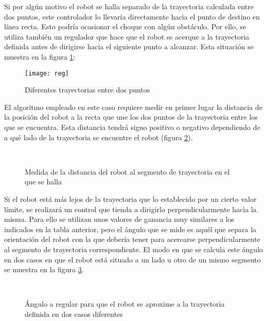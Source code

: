Si por algún motivo el robot se halla separado de la trayectoria calculada entre dos puntos, este controlador lo llevaría directamente hacia el punto de destino en línea recta. Esto podría ocasionar el choque con algún obstáculo. Por ello, se utiliza también un regulador que hace que el robot se acerque a la trayectoria definida antes de dirigirse hacia el siguiente punto a alcanzar. Esta situación se muestra en la figura \ref{fg:reg}:

\begin{figure}[h]
  \centering\texttt{[image: reg]}\\
  \caption{Diferentes trayectorias entre dos puntos}\label{fg:reg}
\end{figure}

El algoritmo empleado en este caso requiere medir en primer lugar la distancia de la posición del robot a la recta que une los dos puntos de la trayectoria entre los que se encuentra. Esta distancia tendrá signo positivo o negativo dependiendo de a qué lado de la trayectoria se encuentre el robot (figura \ref{fg:dist2tray}).

\begin{figure}[h]
    \\
  \caption{ Medida de la distancia del robot al segmento de trayectoria en el que se halla}\label{fg:dist2tray}
\end{figure}

\clearpage
Si el robot está más lejos de la trayectoria que lo establecido por un cierto valor límite, se realizará un control que tienda a dirigirlo perpendicularmente hacia la misma. Para ello se utilizan unos valores de ganancia muy similares a los indicados en la tabla anterior, pero el ángulo que se mide es aquél que separa la orientación del robot con la que debería tener para acercarse perpendicularmente al segmento de trayectoria correspondiente. El modo en que se calcula este ángulo en dos casos en que el robot está situado a un lado u otro de un mismo segmento se muestra en la figura \ref{fg:regu}.

\begin{figure}[h]
    \\
  \caption{Ángulo a regular para que el robot se aproxime a la trayectoria definida en dos casos diferentes}\label{fg:regu}
\end{figure}

